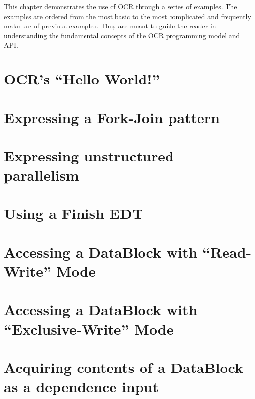This chapter demonstrates the use of OCR through a series of
examples. The examples are ordered from the most basic to the most
complicated and frequently make use of previous examples. They are
meant to guide the reader in understanding the fundamental concepts of
the OCR programming model and API.


\section{OCR's ``Hello World!''}

\section{Expressing a Fork-Join pattern}

\section{Expressing unstructured parallelism}

\section{Using a Finish EDT}

\section{Accessing a DataBlock with ``Read-Write'' Mode}

\section{Accessing a DataBlock with ``Exclusive-Write'' Mode}

\section{Acquiring contents of a DataBlock as a dependence input}

